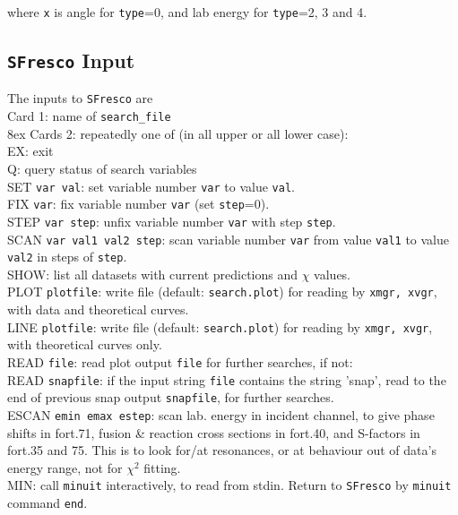 \documentclass[11pt]{article}
\begin{document}
where {\tt x} is angle for {\tt type}=0, and lab energy for {\tt type}=2, 3 and 4.

\subsection*{{\tt SFresco} Input}
The inputs to {\tt SFresco} are\\
Card 1: name of {\tt search\_file}\\

\hangindent 8ex
Cards 2: repeatedly one of (in all upper or all lower case):
\\ EX: exit
\\ Q: query status of search variables
\\ SET {\tt var val}: set variable number {\tt var} to value {\tt val}.
\\ FIX {\tt var}: fix variable number {\tt var} (set {\tt step}=0).
\\ STEP {\tt var step}: unfix variable number {\tt var} with step {\tt step}.
\\ SCAN {\tt var val1 val2 step}: scan variable number {\tt var}
from value {\tt val1} to value {\tt val2} in steps of {\tt step}.
\\ SHOW: list all datasets with current predictions and $\chi$ values.
\\ PLOT {\tt plotfile}: write file (default: {\tt search.plot}) for reading by {\tt xmgr, xvgr},
 with data and theoretical curves.
\\ LINE {\tt plotfile}: write file (default: {\tt search.plot}) for reading by {\tt xmgr, xvgr},
 with theoretical curves only.
\\ READ {\tt file}: read plot output {\tt file} for further searches, if not:
\\ READ {\tt snapfile}: if the input string {\tt file} contains the string 'snap',
read to the end of previous snap output {\tt snapfile}, for further searches.
\\ ESCAN {\tt emin emax estep}: scan lab. energy in incident channel, to give
phase shifts in fort.71, fusion \& reaction cross sections in fort.40,
 and S-factors in fort.35 and 75.
This is to look for/at resonances, or at behaviour out of data's energy range,
not for $\chi^2$ fitting.
\\ MIN: call {\tt minuit} interactively, to read from stdin.
Return to {\tt SFresco} by {\tt minuit} command {\tt end}.
\end{document}
